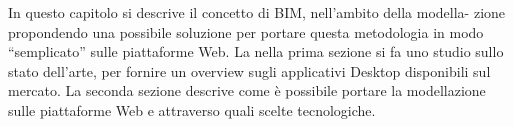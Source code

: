 In questo capitolo si descrive il concetto di BIM, nell’ambito della modella-
zione propondendo una possibile soluzione per portare questa metodologia in modo ``semplicato'' sulle piattaforme Web.
La nella prima sezione si fa uno studio sullo stato dell’arte, per fornire un overview
sugli applicativi Desktop disponibili sul mercato. La seconda sezione descrive come è
possibile portare la modellazione sulle piattaforme Web e attraverso quali scelte tecnologiche.
